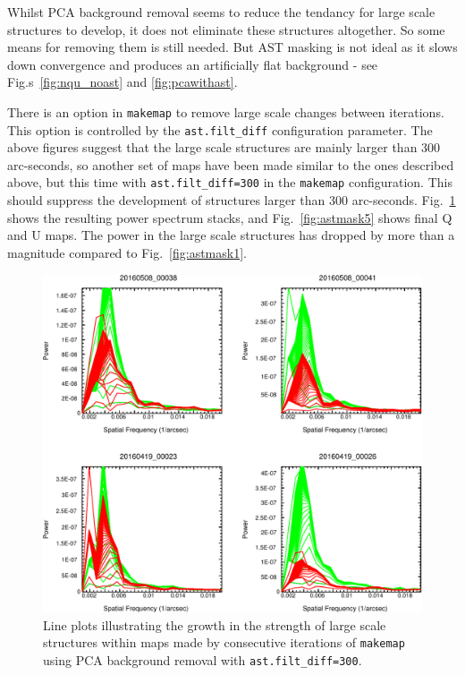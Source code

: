 \documentclass[twoside,11pt]{starlink}
\begin{document}
Whilst PCA background removal seems to reduce the tendancy for large
scale structures to develop, it does not eliminate these structures
altogether. So some means for removing them is still needed. But AST
masking is not ideal as it slows down convergence and produces an
artificially flat background - see Fig.s~\ref{fig:nqu_noast} and
\ref{fig:pcawithast}.

There is an option in \texttt{makemap} to remove large scale changes
between iterations. This option is controlled by the
\texttt{ast.filt\_diff} configuration parameter. The above figures
suggest that the large scale structures are mainly larger than 300
arc-seconds, so another set of maps have been made similar to the ones
described above, but this time with \texttt{ast.filt\_diff=300} in the
\texttt{makemap} configuration. This should suppress the development of
structures larger than 300 arc-seconds. Fig.~\ref{fig:astmask4} shows the
resulting power spectrum stacks, and  Fig.~\ref{fig:astmask5} shows final
Q and U maps. The power in the large scale structures has dropped by more
than a magnitude compared to Fig.~\ref{fig:astmask1}.

\begin{figure}
\includegraphics[width=\columnwidth]{astmask4}
\caption{Line plots illustrating the growth in the strength of large
scale structures within maps made by consecutive iterations of
\texttt{makemap} using PCA background removal with \texttt{ast.filt\_diff=300}.}
\label{fig:astmask4}
\end{figure}
\end{document}
